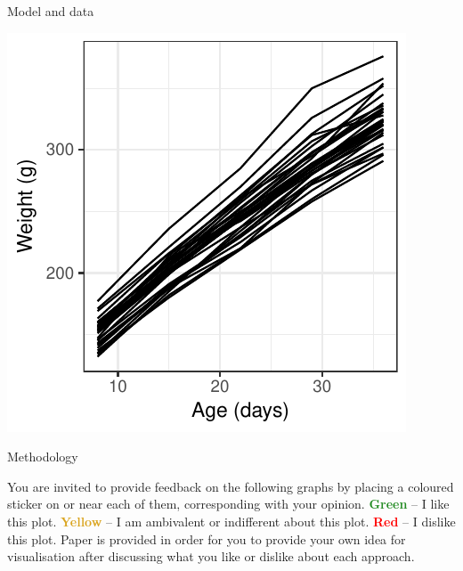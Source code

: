 {\begin{columns}
\begin{column}[t]{0.45\linewidth}
\begin{block}{Model and data}
\begin{minipage}{0.45\linewidth}
	\end{minipage}\quad
	\begin{minipage}{0.45\linewidth}
		
		\includegraphics[width=\linewidth]{data.pdf}
		
	\end{minipage}
	
\end{block}



\begin{block}{Methodology}
	
	\setlength{\parskip}{15pt}
	
	You are invited to provide feedback on the following graphs by placing a coloured sticker on or near each of them, corresponding with your opinion. \textcolor{ForestGreen}{\bfseries Green} -- I like this plot.  \textcolor{Goldenrod}{\bfseries Yellow} -- I am ambivalent or indifferent about this plot.  \textcolor{Red}{\bfseries Red} -- I dislike this plot. Paper is provided in order for you to provide your own idea for visualisation after discussing what you like or dislike about each approach.
	
\end{block}

\end{column}


\end{columns}}
